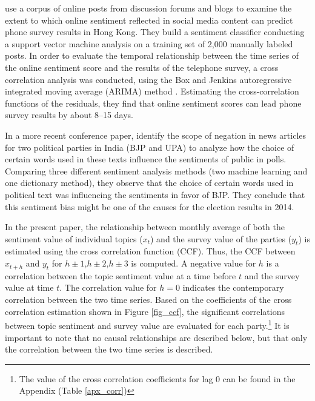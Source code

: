 \documentclass[12pt,a4paper,notitlepage]{article}
\begin{document}
\citet{fu_analyzing_2013} use a corpus of online posts from discussion forums and blogs to examine the extent to which online sentiment reflected in social media content can predict phone survey results in Hong Kong. They build a sentiment classifier conducting a support vector machine analysis on a training set of 2,000 manually labeled posts. In order to evaluate the temporal relationship between the time series of the online sentiment score and the results of the telephone survey, a cross correlation analysis was conducted, using the Box and Jenkins autoregressive integrated moving average (ARIMA) method \citep{box_time_2008}. Estimating the cross-correlation functions of the residuals, they find that online sentiment scores can lead phone survey results by about 8–15 days. 

In a more recent conference paper, \citet{padmaja_evaluating_2014} identify the scope of negation in news articles for two political parties in India (BJP and UPA) to analyze how the choice of certain words used in these texts influence the sentiments of public in polls. Comparing three different sentiment analysis methods (two machine learning and one dictionary method), they observe that the choice of certain words used in political text was influencing the sentiments in favor of BJP. They conclude that this sentiment bias might be one of the causes for the election results in 2014.

In the present paper, the relationship between monthly average of both the sentiment value of individual topics ($x_t$) and the survey value of the parties ($y_t$) is estimated using the cross correlation function (CCF). Thus, the CCF between $x_{t+h}$ and $y_t$ for $h\pm 1$,$h \pm 2$,$h \pm 3$ is computed. A negative value for $h$ is a correlation between the topic sentiment value at a time before $t$ and the survey value at time $t$. The correlation value for $h=0$ indicates the contemporary correlation between the two time series.  Based on the coefficients of the cross correlation estimation shown in Figure \ref{fig_ccf}, the significant correlations between topic sentiment and survey value are evaluated for each party.\footnote{The value of the cross correlation coefficients for lag 0 can be found in the Appendix (Table \ref{apx_corr})} It is important to note that no causal relationships are described below, but that only the correlation between the two time series is described. 
\end{document}
